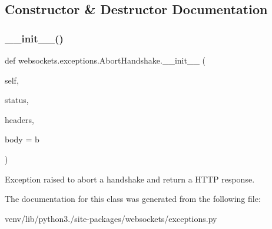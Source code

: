 \subsection{Constructor \& Destructor Documentation}
\mbox{\label{classwebsockets_1_1exceptions_1_1_abort_handshake_a0961854c8a62497d3c1ff4cc5ed4d9e0}} 
\subsubsection{\texorpdfstring{\+\_\+\+\_\+init\+\_\+\+\_\+()}{\_\_init\_\_()}}
{\footnotesize\ttfamily def websockets.\+exceptions.\+Abort\+Handshake.\+\_\+\+\_\+init\+\_\+\+\_\+ (\begin{DoxyParamCaption}\item[{}]{self,  }\item[{}]{status,  }\item[{}]{headers,  }\item[{}]{body = {\ttfamily b\textquotesingle{}\textquotesingle{}} }\end{DoxyParamCaption})}

\begin{DoxyVerb}Exception raised to abort a handshake and return a HTTP response.\end{DoxyVerb}
 

The documentation for this class was generated from the following file\+:\begin{DoxyCompactItemize}
\item 
venv/lib/python3./site-\/packages/websockets/exceptions.\+py\end{DoxyCompactItemize}
